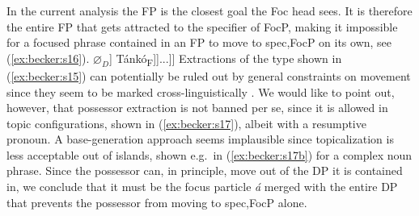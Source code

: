 \documentclass[output=paper,
modfonts
]{langscibook}
\begin{document}
In the current analysis the FP is the closest goal the Foc head sees. It is therefore the entire FP that gets attracted to the specifier of FocP, making it impossible for a focused phrase contained in an FP to move to spec,FocP on its own, see (\ref{ex:becker:s16}).
\ea \relax[\textsubscript{FocP} \tikzmark{s16f2}\hspace{2mm}\tikzmark{s16f} [\textsubscript{Foc} c\'i] [\textsubscript{TP} ... [\textsubscript{F\tikzmark{s16t}P} \'a [\textsubscript{DP} [\textsubscript{D$'$} [\textsubscript{NP} nd\'ur] $\varnothing_D$] Tánkó\textsubscript{F}]]...]]
     \label{ex:becker:s16}
\z
\vspace{2\baselineskip}
Extractions of the type shown in (\ref{ex:becker:s15}) can potentially be ruled out by general constraints on movement since they seem to be marked cross-linguistically \citep{Corver1990a,Zeljko2005}. We would like to point out, however, that possessor extraction is not banned per se, since it is allowed in topic configurations, shown in (\ref{ex:becker:s17}), albeit with a resumptive pronoun. A base-generation approach seems implausible since topicalization is less acceptable out of islands, shown e.g.\ in (\ref{ex:becker:s17b}) for a complex noun phrase.
\ea
{}
\z \z
Since the possessor can, in principle, move out of the DP it is contained in, we conclude that it must be the focus particle {\em \'a} merged with the entire DP that prevents the possessor from moving to spec,FocP alone.
\end{document}
